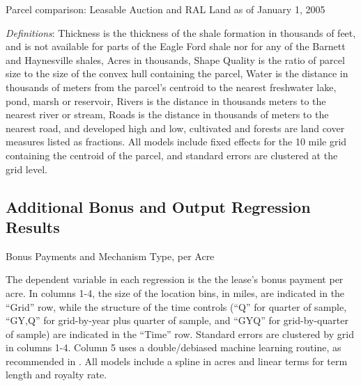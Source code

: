 \documentclass[12pt]{article}
\begin{document}
\begin{appendices}
\addtolength{\tabcolsep}{-3pt}
\begin{table}[htbp]
	\begin{center}
	\begin{threeparttable}
	\caption{Parcel comparison: Leasable Auction and RAL Land as of January 1, 2005}
	\label{tab:ParcelBalanceLeaseable}
	\small
	       
	\footnotesize
		\begin{tablenotes}			
			\item \textit{Definitions}: Thickness is the thickness of the shale formation in thousands of feet, and is not available for parts of the Eagle Ford shale nor for any of the Barnett and Haynesville shales, Acres in thousands, Shape Quality is the ratio of parcel size to the size of the convex hull containing the parcel, Water is the distance in thousands of meters from the parcel's centroid to the nearest freshwater lake, pond, marsh or reservoir, Rivers is the distance in thousands meters to the nearest river or stream, Roads is the distance in thousands of meters to the nearest road, and developed high and low, cultivated and forests are land cover measures listed as fractions. All models include fixed effects for the 10 mile grid containing the centroid of the parcel, and standard errors are clustered at the grid level. 
			\end{tablenotes}
	\end{threeparttable}
	\end{center}
\end{table}
\addtolength{\tabcolsep}{3pt}

\subsection{Additional Bonus and Output Regression Results}\label{sec:extra_regressions}

\addtolength{\tabcolsep}{6pt}
\begin{table}[H]
	\begin{center}
	\begin{threeparttable}
		\caption{Bonus Payments and Mechanism Type, per Acre}
		\label{tab:table_main_bonus_levels}
		\small
		            
		\begin{tablenotes}
		\footnotesize
		\item The dependent variable in each regression is the the lease's bonus payment per acre. In columns 1-4, the size of the location bins, in miles, are indicated in the ``Grid'' row, while the structure of the time controls (``Q'' for quarter of sample, ``GY,Q'' for grid-by-year plus quarter of sample, and ``GYQ'' for grid-by-quarter of sample) are indicated in the ``Time'' row.  Standard errors are clustered by grid in columns 1-4.  Column 5 uses a double/debiased machine learning routine, as recommended in \cite{chernozhukov2018double}.  All models include a spline in acres and linear terms for term length and royalty rate.  
		\end{tablenotes}
	\end{threeparttable}
	\end{center}
\end{table}


\end{appendices}
\end{document}

